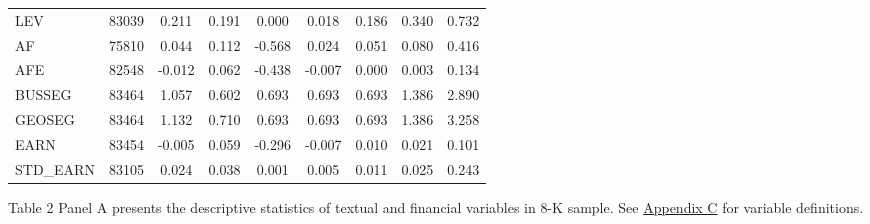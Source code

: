 \begin{table}[htbp]
\begin{center}
\begin{tabular}{lcccccccc}
    LEV & 83039 & 0.211 & 0.191 & 0.000 & 0.018 & 0.186 & 0.340 & 0.732 \\
    AF & 75810 & 0.044 & 0.112 & -0.568 & 0.024 & 0.051 & 0.080 & 0.416 \\
    AFE & 82548 & -0.012 & 0.062 & -0.438 & -0.007 & 0.000 & 0.003 & 0.134 \\
    BUSSEG & 83464 & 1.057 & 0.602 & 0.693 & 0.693 & 0.693 & 1.386 & 2.890 \\
    GEOSEG & 83464 & 1.132 & 0.710 & 0.693 & 0.693 & 0.693 & 1.386 & 3.258 \\
    EARN & 83454 & -0.005 & 0.059 & -0.296 & -0.007 & 0.010 & 0.021 & 0.101 \\
    STD\_EARN & 83105 & 0.024 & 0.038 & 0.001 & 0.005 & 0.011 & 0.025 & 0.243 \\
    \bottomrule
    \bottomrule
    \end{tabular}%
	\end{center}
	\begin{footnotesize}
		\noindent Table 2 Panel A presents the descriptive statistics of textual and financial variables in 8-K sample. See \hyperref[appc]{Appendix C} for variable definitions.
	\end{footnotesize}
\end{table}%
